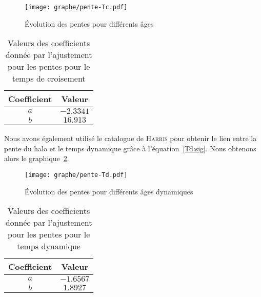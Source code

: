 	\begin{figure}[hbt!]
		\centering \texttt{[image: graphe/pente-Tc.pdf]}
		\caption{Évolution des pentes pour différents âges}
		\label{Pente-lin_dim}
	\end{figure}
	\begin{table}[hbt!]
		\begin{center}
			\begin{tabular}{|c|c|}%
				\hline
				Coefficient & Valeur \\ %
				\hline
				\hline
				$a$       &         $-2.3341$   \\ %
				\hline
				$b$       &         $16.913$   \\  %
				\hline
			\end{tabular}
		\end{center}
		\caption{Valeurs des coefficients donnée par l'ajustement pour les pentes pour le temps de croisement}
		\label{pente-lin-coeff_dim}
	\end{table}

	Nous avons également utilisé le catalogue de \textsc{Harris} pour obtenir le lien entre la pente du halo et le temps dynamique
	grâce à l'équation~\ref{Td:sig}. Nous obtenons alors le graphique~\ref{Pente-Td-lin}.
	\begin{figure}[hbt!]
		\centering \texttt{[image: graphe/pente-Td.pdf]}
		\caption{Évolution des pentes pour différents âges dynamiques}
		\label{Pente-Td-lin}
	\end{figure}
	\begin{table}[hbt!]
		\begin{center}
			\begin{tabular}{|c|c|}%
				\hline
				Coefficient & Valeur \\ %
				\hline
				\hline
				$a$       &        $-1.6567$   \\ %
				\hline
				$b$       &        $1.8927$     \\ %
				\hline
			\end{tabular}
		\end{center}
		\caption{Valeurs des coefficients donnée par l'ajustement pour les pentes pour le temps dynamique}
		\label{pente-Td-lin-coeff}
	\end{table}

